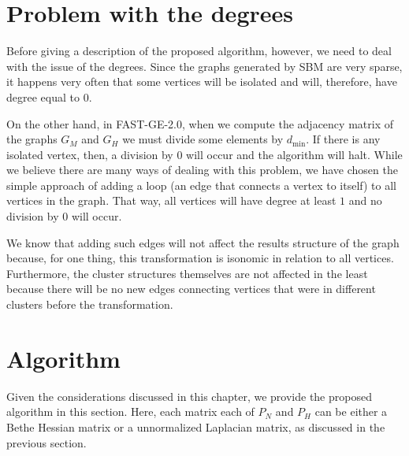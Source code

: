 \section{Problem with the degrees}
Before giving a description of the proposed algorithm, however, we need to deal with the issue of the degrees.
Since the graphs generated by SBM are very sparse, it happens very often that some vertices will be isolated and will, therefore, have degree equal to $0$.

On the other hand, in FAST-GE-2.0, when we compute the adjacency matrix of the graphs $G_M$ and $G_H$ we must divide some elements by $d_\text{min}$.
If there is any isolated vertex, then, a division by $0$ will occur and the algorithm will halt.
While we believe there are many ways of dealing with this problem, we have chosen the simple approach of adding a loop (an edge that connects a vertex to itself) to all vertices in the graph.
That way, all vertices will have degree at least $1$ and no division by $0$ will occur.

We know that adding such edges will not affect the results structure of the graph because, for one thing, this transformation is isonomic in relation to all vertices.
Furthermore, the cluster structures themselves are not affected in the least because there will be no new edges connecting vertices that were in different clusters before the transformation.

\section{Algorithm}
Given the considerations discussed in this chapter, we provide the proposed algorithm in this section.
Here, each matrix each of $P_N$ and $P_H$ can be either a Bethe Hessian matrix or a unnormalized Laplacian matrix, as discussed in the previous section.

